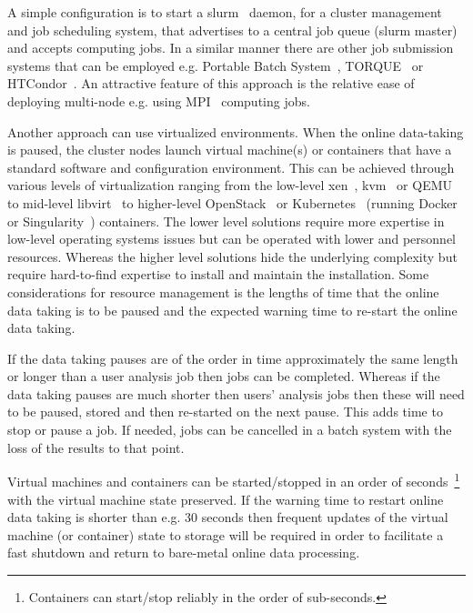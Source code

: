 \documentclass[12pt,a4paper]{article}
\begin{document}
A simple configuration is to start a slurm~\cite{slurm} daemon, for a cluster management and job scheduling system, that advertises to a central job queue (slurm master) and accepts computing jobs.
In a similar manner there are other job submission systems that can be employed e.g. Portable Batch System~\cite{pbs}, TORQUE~\cite{torque} or HTCondor~\cite{htcondor}.
An attractive feature of this approach is the relative ease of deploying multi-node e.g. using MPI~\cite{mpi} computing jobs.

Another approach can use virtualized environments.
When the online data-taking is paused, the cluster nodes launch virtual machine(s) or containers that have a standard \ED software and configuration environment.
This can be achieved through various levels of virtualization ranging from the low-level xen~\cite{xen}, kvm~\cite{kvm} or QEMU~\cite{qemu} to mid-level libvirt~\cite{libvirt} to higher-level OpenStack~\cite{openstack} or Kubernetes~\cite{kubernetes}
(running Docker~\cite{docker} or Singularity~\cite{singularity}) containers.
The lower level solutions require more expertise in low-level operating systems issues but can be operated with lower \einfra and personnel resources.
Whereas the higher level solutions hide the underlying complexity but require hard-to-find expertise to install and maintain the installation.
Some considerations for resource management is the lengths of time that the online data taking is to be paused and the expected warning time to re-start the online data taking.

If the data taking pauses are of the order in time approximately the same length or longer than a user analysis job then jobs can be completed. 
Whereas if the data taking pauses are much shorter then users' analysis jobs then these will need to be paused, stored and then re-started on the next pause.
This adds time to stop or pause a job.
If needed, jobs can be cancelled in a batch system with the loss of the results to that point.

Virtual machines and containers can be started/stopped in an order of seconds~\footnote{Containers can start/stop reliably in the order of sub-seconds.} with the virtual machine state preserved.
If the warning time to restart online data taking is shorter than e.g. 30 seconds then frequent updates of the virtual machine (or container) state to storage will be required in order to facilitate a fast shutdown and return to bare-metal online data processing.
\end{document}
